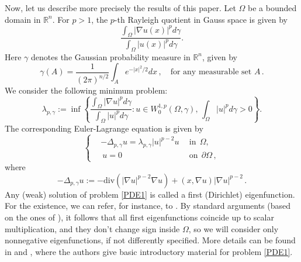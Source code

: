 \documentclass[12pt]{amsart}
\newcommand{\R}{\mathbb R}
\newcommand{\1}{\mathbf 1}
\begin{document}
Now, let us describe more precisely the results of this paper. Let $\Omega$ be a bounded domain in $\R^n$. For $p>1$, the $p$-th Rayleigh quotient in Gauss space is given by
\begin{equation}\label{varia-defi}
\frac{\int_{\Omega} |\nabla u(x)|^{p} d\gamma}{\int_\Omega |u(x)|^{p} d\gamma}.
\end{equation}
Here $\gamma$ denotes the Gaussian probability measure in $\R^n$, given by
$$
\gamma(A)= \frac{1}{(2\pi)^{n/2}} \int_{A} e^{-|x|^2/2} dx\,,\quad\text{for any measurable set }A\,.
$$
We consider the following minimum problem:
$$
\lambda_{p,\gamma}:=\inf\left\{
\frac{\int_{\Omega} |\nabla u|^{p} d\gamma}{\int_\Omega |u|^{p} d\gamma}\colon u\in W^{1,p}_0(\Omega,\gamma),\, \int_\Omega |u|^{p} d\gamma>0
\right\}.
$$
The corresponding Euler-Lagrange equation is given by
\begin{equation}\label{PDE1}
\left\{
\begin{aligned}
& -\Delta_{p,\gamma} u=\lambda_{p,\gamma} |u|^{p-2}u \ \  &\mathrm {in}\ \ \Omega, \\
&\ u=0 \ \ \ \ &\mathrm {on} \ \ \partial \Omega\,,
\end{aligned}
\right.
\end{equation}
where
$$
-\Delta_{p,\gamma} u:=-\text{div}(|\nabla u|^{p-2} \nabla u)+(x,\nabla u)|\nabla u|^{p-2}\,.
$$
Any (weak) solution of problem \eqref{PDE1} is called a first (Dirichlet) eigenfunction. For the existence, we can refer, for instance, to \cite[section 6]{Franceschi2024}.
By standard arguments (based on the ones of \cite{Lindqvist1990}), it follows that all first eigenfunctions coincide up to scalar multiplication, and they don't change sign inside $\Omega$, so we will consider only nonnegative eigenfunctions, if not differently specified.
More details can be found in \cite{Feng2021} and \cite{Franceschi2024}, where the authors give basic introductory material for problem \eqref{PDE1}.
\end{document}
